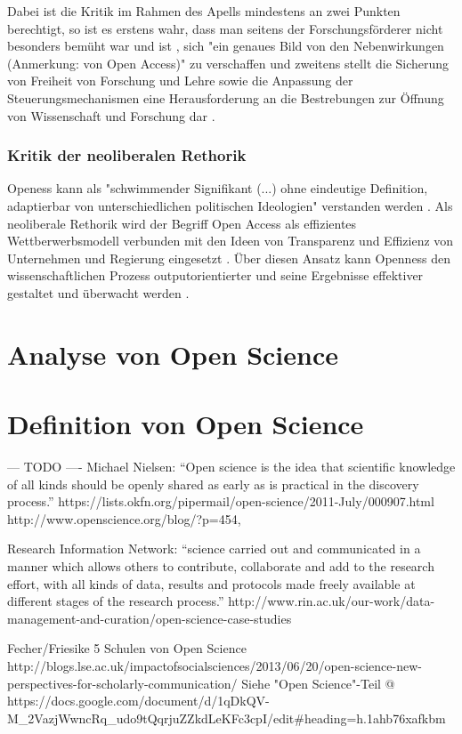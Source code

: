 Dabei ist die Kritik im Rahmen des Apells mindestens an zwei Punkten berechtigt, so ist es erstens wahr, dass man seitens der Forschungsförderer nicht besonders bemüht war und ist \cite{suchen}, sich "ein genaues Bild von den Nebenwirkungen (Anmerkung: von Open Access)" \cite{Reuss_2009} zu verschaffen und zweitens stellt die Sicherung von Freiheit von Forschung und Lehre sowie die Anpassung der Steuerungsmechanismen eine Herausforderung an die Bestrebungen zur Öffnung von Wissenschaft und Forschung dar \cite{suchen}.

\subsubsection{Kritik der neoliberalen Rethorik}

Openess kann als "schwimmender Signifikant (...) ohne eindeutige Definition, adaptierbar von unterschiedlichen politischen Ideologien" verstanden werden \cite{Adema_2014_open_access}. Als neoliberale Rethorik wird der Begriff Open Access als effizientes Wettberwerbsmodell verbunden mit den Ideen von Transparenz und Effizienz von Unternehmen und Regierung eingesetzt \cite{tkacz_2012_open}. Über diesen Ansatz kann Openness den wissenschaftlichen Prozess outputorientierter und seine Ergebnisse effektiver gestaltet und überwacht werden \cite{adema_2010_oaoverview} . 

\section{Analyse von Open Science} 


\section{Definition von Open Science} 
--- TODO ---- Michael Nielsen: “Open science is the idea that scientific knowledge of all kinds should be openly shared as early as is practical in the discovery process.”  https://lists.okfn.org/pipermail/open-science/2011-July/000907.html
http://www.openscience.org/blog/?p=454,

Research Information Network: “science carried out and communicated in a manner which allows others to contribute, collaborate and add to the research effort, with all kinds of data, results and protocols made freely available at different stages of the research process.” http://www.rin.ac.uk/our-work/data-management-and-curation/open-science-case-studies

Fecher/Friesike 5 Schulen von Open Science http://blogs.lse.ac.uk/impactofsocialsciences/2013/06/20/open-science-new-perspectives-for-scholarly-communication/ 
Siehe "Open Science"-Teil @ https://docs.google.com/document/d/1qDkQV-M_2VazjWwncRq_udo9tQqrjuZZkdLeKFc3cpI/edit#heading=h.1ahb76xafkbm

